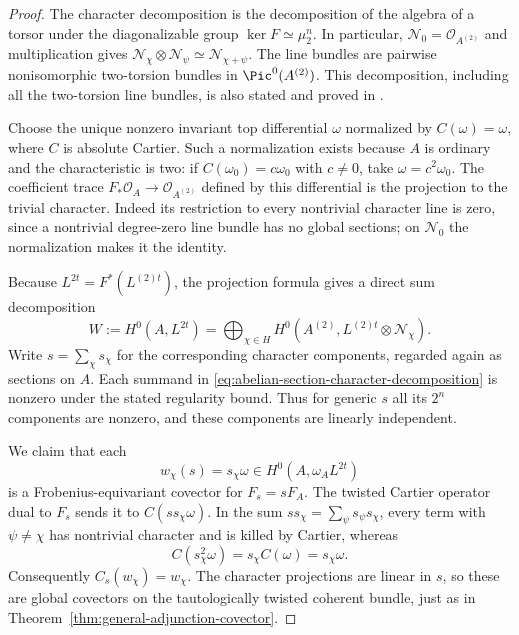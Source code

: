 \begin{proof}
The character decomposition is the decomposition of the
algebra of a torsor under the diagonalizable group
$\ker F\simeq\mu_2^n$.  In particular,
$\mathcal N_0=\mathcal O_{A^{(2)}}$ and multiplication gives
$\mathcal N_\chi\otimes\mathcal N_\psi\simeq
\mathcal N_{\chi+\psi}$.
The line bundles are pairwise nonisomorphic two-torsion
bundles in $\Pic^0(A^{(2)})$.
This decomposition, including all the two-torsion line
bundles, is also stated and proved in
\cite[Lemma~4.5, p.~11]{SannaiTanaka2016}.

Choose the unique nonzero invariant top differential
$\omega$ normalized by $C(\omega)=\omega$, where $C$
is absolute Cartier.  Such a normalization exists because
$A$ is ordinary and the characteristic is two: if
$C(\omega_0)=c\omega_0$ with $c\ne0$, take
$\omega=c^2\omega_0$.
The coefficient trace $F_*\mathcal O_A\to\mathcal O_{A^{(2)}}$
defined by this differential is the projection to the
trivial character.  Indeed its restriction to every
nontrivial character line is zero, since a nontrivial
degree-zero line bundle has no global sections; on
$\mathcal N_0$ the normalization makes it the identity.

Because $L^{2t}=F^*(L^{(2)t})$, the projection formula
gives a direct sum decomposition
\begin{equation}\label{eq:abelian-section-character-decomposition}
 W:=H^0(A,L^{2t})
    =\bigoplus_{\chi\in H}
       H^0(A^{(2)},L^{(2)t}\otimes\mathcal N_\chi).
\end{equation}
Write $s=\sum_\chi s_\chi$ for the corresponding
character components, regarded again as sections on $A$.
Each summand in \eqref{eq:abelian-section-character-decomposition}
is nonzero under the stated regularity bound.  Thus for
generic $s$ all its $2^n$ components are nonzero, and
these components are linearly independent.

We claim that each
\[
 w_\chi(s)=s_\chi\omega\in H^0(A,\omega_A L^{2t})
\]
is a Frobenius-equivariant covector for $F_s=sF_A$.
The twisted Cartier operator dual to $F_s$ sends it to
$C(s s_\chi\omega)$.  In the sum
$s s_\chi=\sum_\psi s_\psi s_\chi$, every term with
$\psi\ne\chi$ has nontrivial character and is killed
by Cartier, whereas
\[
 C(s_\chi^2\omega)=s_\chi C(\omega)=s_\chi\omega.
\]
Consequently $C_s(w_\chi)=w_\chi$.
The character projections are linear in $s$, so these
are global covectors on the tautologically twisted
coherent bundle, just as in
Theorem~\ref{thm:general-adjunction-covector}.


\end{proof}
